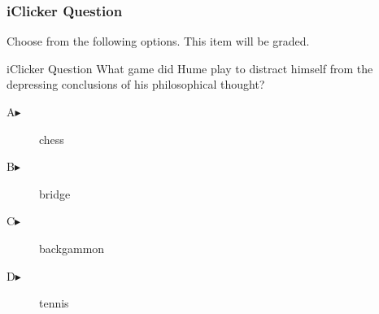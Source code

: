 \begin{frame}
  \frametitle{iClicker Question}
Choose from the following options. This item will be graded.
\begin{block}{iClicker Question}
What game did Hume play to distract himself from the depressing
conclusions of his philosophical thought?
\end{block}
\begin{description}
\item[A\hspace{.2in}$\blacktriangleright$] chess
\item[B\hspace{.2in}$\blacktriangleright$] bridge
\item[C\hspace{.2in}$\blacktriangleright$] backgammon
\item[D\hspace{.2in}$\blacktriangleright$] tennis
\end{description}
\end{frame}
